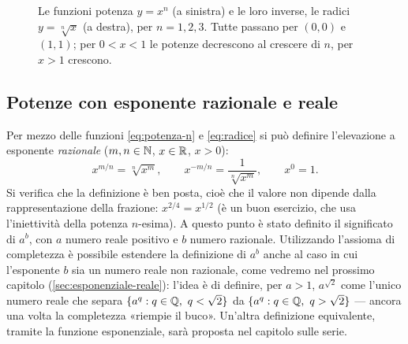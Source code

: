\begin{figure}[htb]
\centering
{}\hfill
{}
\caption{Le funzioni potenza $y=x^{n}$ (a sinistra) e le loro inverse, le radici
$y=\sqrt[n]{x}$ (a destra), per $n=1,2,3$. Tutte passano per $(0,0)$ e $(1,1)$; per
$0<x<1$ le potenze decrescono al crescere di $n$, per $x>1$ crescono.}
\label{fig:potenze-radici}
\end{figure}

\subsection{Potenze con esponente razionale e reale}

Per mezzo delle funzioni \eqref{eq:potenza-n} e \eqref{eq:radice} si può definire
l'elevazione a esponente \emph{razionale} ($m,n\in\mathbb{N}$, $x\in\mathbb{R}$, $x>0$):
\begin{equation}\label{eq:potenza-razionale}
  x^{m/n}=\sqrt[n]{x^{m}}, \qquad x^{-m/n}=\frac{1}{\sqrt[n]{x^{m}}}, \qquad x^{0}=1.
\end{equation}
Si verifica che la definizione è ben posta, cioè che il valore non dipende dalla
rappresentazione della frazione: $x^{2/4}=x^{1/2}$ (è un buon esercizio, che usa
l'iniettività della potenza $n$-esima). A questo punto è stato definito il significato
di $a^{b}$, con $a$ numero reale positivo e $b$ numero razionale. Utilizzando
l'assioma di completezza è possibile estendere la definizione di $a^{b}$ anche al caso
in cui l'esponente $b$ sia un numero reale non razionale, come vedremo nel prossimo
capitolo (\cref{sec:esponenziale-reale}): l'idea è di definire, per $a>1$, $a^{\sqrt2}$
come l'unico numero reale che separa
$\{a^{q}: q\in\mathbb{Q},\ q<\sqrt2\}$ da $\{a^{q}: q\in\mathbb{Q},\ q>\sqrt2\}$ --- ancora una volta
la completezza «riempie il buco». Un'altra definizione equivalente, tramite la funzione
esponenziale, sarà proposta nel capitolo sulle serie.

